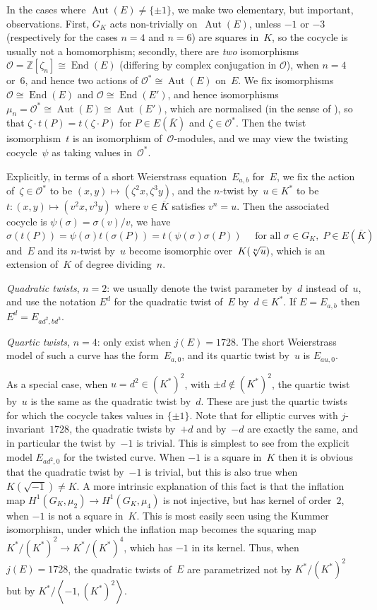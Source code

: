 \documentclass[12pt, reqno]{amsart}
\newcommand{\Z}{\mathbb{Z}}
\newcommand{\Kbar}{{\overline{K}}}
\newcommand{\calO}{\mathcal{O}}
\DeclareMathOperator{\Aut}{Aut}
\DeclareMathOperator{\End}{End}
\numberwithin{equation}{section}
\theoremstyle{definition}
\theoremstyle{remark}
\begin{document}
In the cases where $\Aut(E)\not=\{\pm1\}$, we make two elementary, but
important, observations. First, $G_K$ acts non-trivially on~$\Aut(E)$,
unless $-1$ or $-3$ (respectively for the cases $n=4$ and $n=6$) are
squares in~$K$, so the cocycle is usually not a homomorphism;
secondly, there are \emph{two} isomorphisms
$\calO=\Z[\zeta_n]\cong\End(E)$ (differing by complex conjugation in
$\calO$), when $n=4$ or~$6$, and hence two actions of
$\calO^*\cong\Aut(E)$ on~$E$.  We fix isomorphisms $\calO\cong\End(E)$
and $\calO\cong\End(E')$, and hence isomorphisms
$\mu_n=\calO^*\cong\Aut(E)\cong\Aut(E')$, which are normalised (in the
sense of \cite[Prop.~I.1.1]{SilvermanII}), so that $\zeta\cdot
t(P)=t(\zeta\cdot P)$ for $P\in E(\Kbar)$ and $\zeta\in\calO^*$. Then
the twist isomorphism~$t$ is an isomorphism of~$\calO$-modules, and we
may view the twisting cocycle~$\psi$ as taking values in~$\calO^*$.

Explicitly, in terms of a short Weierstrass equation~$E_{a,b}$ for~$E$, we fix
the action of~$\zeta\in\calO^*$ to be
$(x,y)\mapsto(\zeta^2x,\zeta^3y)$, and the $n$-twist by~$u\in K^*$ to be
$t:(x,y)\mapsto(v^2x,v^3y)$ where $v \in \overline{K}$ satisfies $v^n=u$. Then the associated cocycle is
$\psi(\sigma)=\sigma(v)/v$, we have
\begin{equation}\label{E:twist}
  \sigma(t(P)) = \psi(\sigma)t(\sigma(P)) = t(\psi(\sigma)\sigma(P))
   \quad \text{ for all } \sigma \in G_K,
  \; P \in E(\Kbar)
\end{equation}
and~$E$ and its $n$-twist by~$u$ become isomorphic
over~$K(\root n\of u)$, which is an extension of~$K$ of degree
dividing~$n$.

\emph{Quadratic twists}, $n=2$: we usually denote the twist
parameter by~$d$ instead of~$u$, and use the notation $E^d$ for the
quadratic twist of~$E$ by~$d\in K^*$.  If $E=E_{a,b}$ then
$E^d=E_{ad^2,bd^3}$.

\emph{Quartic twists}, $n=4$: only exist when $j(E)=1728$.  The short
Weierstrass model of such a curve has the form~$E_{a,0}$, and its
quartic twist by~$u$ is $E_{au,0}$.

As a special case, when $u=d^2\in(K^*)^2$, with $\pm d\notin(K^*)^2$,
the quartic twist by~$u$ is the same as the quadratic twist by~$d$.
These are just the quartic twists for which the cocycle takes values
in $\{\pm1\}$.  Note that for elliptic curves with
$j$-invariant~$1728$, the quadratic twists by~$+d$ and by~$-d$ are
exactly the same, and in particular the twist by~$-1$ is trivial.
This is simplest to see from the explicit model $E_{ad^2,0}$ for the
twisted curve.  When $-1$ is a square in~$K$ then it is obvious that
the quadratic twist by~$-1$ is trivial, but this is also true when
$K(\sqrt{-1})\not=K$.  A more intrinsic explanation of this fact is
that the inflation map $H^1(G_K,\mu_2)\to H^1(G_K,\mu_4)$ is not
injective, but has kernel of order~$2$, when $-1$ is not a square
in~$K$.  This is most easily seen using the Kummer isomorphism, under
which the inflation map becomes the squaring map $K^*/(K^*)^2 \to
K^*/(K^*)^4$, which has $-1$ in its kernel.  Thus, when $j(E)=1728$,
the quadratic twists of~$E$ are parametrized not by $K^*/(K^*)^2$ but
by $K^*/\left<-1,(K^*)^2\right>$.
\end{document}
